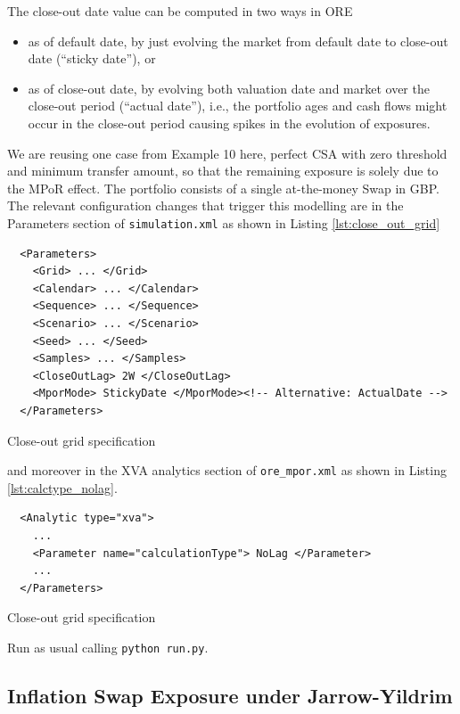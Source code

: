 \documentclass[12pt, a4paper]{article}
\begin{document}
The close-out date value can be computed in two ways in ORE
\begin{itemize}
\item as of default date, by just evolving the market from default date to close-out date
   (``sticky date''), or 
\item  as of close-out date, by evolving both valuation date and market over the 
   close-out period (``actual date''), i.e., the portfolio ages and cash flows might occur
   in the close-out period causing spikes in the evolution of exposures. 
\end{itemize}

We are reusing one case from Example 10 here, perfect CSA with zero threshold and
minimum transfer amount, so that the remaining exposure is solely due to the MPoR
effect. The portfolio consists of a single at-the-money Swap in GBP. 
The relevant configuration changes that trigger this modelling are in the Parameters section of {\tt simulation.xml} as shown in Listing \ref{lst:close_out_grid}

\begin{listing}[H]
\begin{verbatim}
  <Parameters>
    <Grid> ... </Grid>
    <Calendar> ... </Calendar>
    <Sequence> ... </Sequence>
    <Scenario> ... </Scenario>
    <Seed> ... </Seed>
    <Samples> ... </Samples>
    <CloseOutLag> 2W </CloseOutLag>
    <MporMode> StickyDate </MporMode><!-- Alternative: ActualDate -->
  </Parameters>
\end{verbatim}
\caption{Close-out grid specification}
\label{lst:close_out_grid}
\end{listing}

and moreover in the XVA analytics section of {\tt ore\_mpor.xml} as shown in Listing \ref{lst:calctype_nolag}.

\begin{listing}[H]
\begin{verbatim}
  <Analytic type="xva">
    ...
    <Parameter name="calculationType"> NoLag </Parameter>
    ...
  </Parameters>
\end{verbatim}
\caption{Close-out grid specification}
\label{lst:calctype_nolag}
\end{listing}

Run as usual calling {\tt python run.py}.

\subsection{Inflation Swap Exposure under Jarrow-Yildrim}%
\label{example:32}
\end{document}
